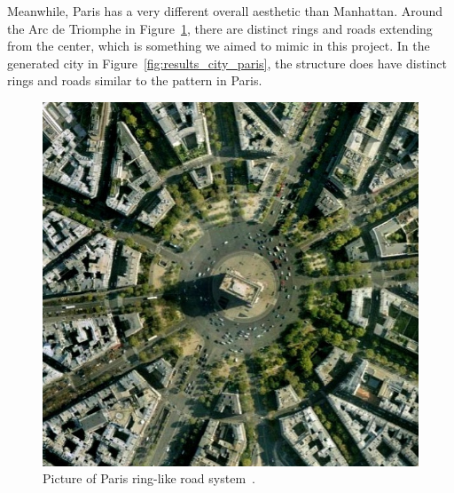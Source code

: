 Meanwhile, Paris has a very different overall aesthetic than Manhattan.
Around the Arc de Triomphe in Figure~\ref{fig:results_real_city_paris}, there are distinct rings and roads extending from the center, which is something we aimed to mimic in this project.
In the generated city in Figure~\ref{fig:results_city_paris}, the structure does have distinct rings and roads similar to the pattern in Paris. 

\begin{figure}[H]
  \centering
  \begin{minipage}{.45\textwidth}
    \centering
    \begin{minipage}{.9\textwidth}
      \centering
      \includegraphics[width=\textwidth]{figure/results/paris_arc_de_triomphe.jpg}
      \caption{Picture of Paris ring-like road system~\cite{paris_city_img}.}
      \label{fig:results_real_city_paris}
    \end{minipage}
  \end{minipage}
  \begin{minipage}{.45\textwidth}
    \begin{minipage}{.9\textwidth}
      \centering
      \centering

\end{minipage}
\end{minipage}
\end{figure}
